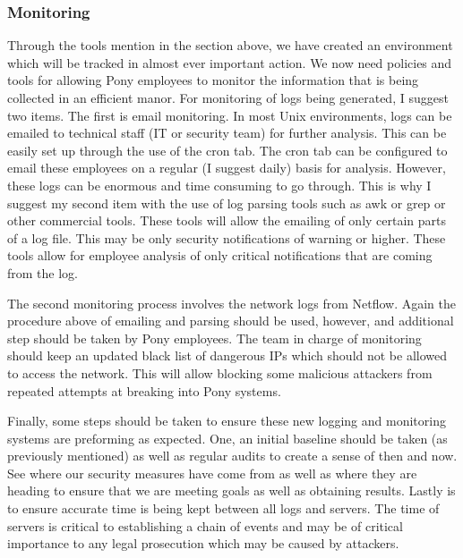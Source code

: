 \documentclass[paper=a4, fontsize=11pt]{scrartcl} %
\numberwithin{equation}{section} %
\numberwithin{figure}{section} %
\numberwithin{table}{section} %
\begin{document}

\subsubsection{Monitoring}
Through the tools mention in the section above, we have created an environment which
will be tracked in almost ever important action. We now need policies and tools for
allowing Pony employees to monitor the information that is being collected in an
efficient manor. For monitoring of logs being generated, I suggest two items. The first 
is email monitoring. In most Unix environments, logs can be emailed to technical
staff (IT or security team) for further analysis. This can be easily set up through
the use of the cron tab. The cron tab can be configured to email these employees on a
regular (I suggest daily) basis for analysis. However, these logs can be enormous
and time consuming to go through. This is why I suggest my second item with the use
of log parsing tools such as awk or grep or other commercial tools. These tools will
allow the emailing of only certain parts of a log file. This may be only security
notifications of warning or higher. These tools allow for employee analysis of only
critical notifications that are coming from the log.

The second monitoring process involves the network logs from Netflow. Again the procedure
above of emailing and parsing should be used, however, and additional step should
be taken by Pony employees. The team in charge of monitoring should keep an updated
black list of dangerous IPs which should not be allowed to access the network. This will
allow blocking some malicious attackers from repeated attempts at breaking into Pony 
systems.

Finally, some steps should be taken to ensure these new logging and monitoring systems
are preforming as expected. One, an initial baseline should be taken (as previously 
mentioned) as well as regular audits to create a sense of then and now. See where
our security measures have come from as well as where they are heading to ensure that
we are meeting goals as well as obtaining results. Lastly is to ensure accurate
time is being kept between all logs and servers. The time of servers is critical to
establishing a chain of events and may be of critical importance to any legal
prosecution which may be caused by attackers.


\end{document}
